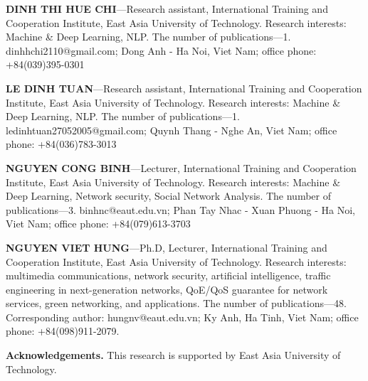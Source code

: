 \documentclass[10pt]{SPIIRAS_Proceedings}
\begin{document}
\begin{aboutAuthors}
    \textbf{DINH THI HUE CHI}—Research assistant, International Training and Cooperation Institute, East Asia University of Technology. Research interests: Machine \& Deep Learning, NLP. The number of publications—1. dinhhchi2110@gmail.com; Dong Anh - Ha Noi, Viet Nam; office phone: +84(039)395-0301\smallskip
    
    \textbf{LE DINH TUAN}—Research assistant, International Training and Cooperation Institute, East Asia University of Technology. Research interests: Machine \& Deep Learning, NLP. The number of publications—1. ledinhtuan27052005@gmail.com; Quynh Thang - Nghe An, Viet Nam; office phone: +84(036)783-3013\smallskip

    \textbf{NGUYEN CONG BINH}—Lecturer, International Training and Cooperation Institute, East Asia University of Technology. Research interests: Machine \& Deep Learning, Network security, Social Network Analysis. The number of publications—3. binhnc@eaut.edu.vn; Phan Tay Nhac - Xuan Phuong - Ha Noi, Viet Nam; office phone: +84(079)613-3703\smallskip

    \textbf{NGUYEN VIET HUNG}—Ph.D, Lecturer, International Training and Cooperation Institute, East Asia University of Technology. Research interests: multimedia communications, network security, artificial intelligence, traffic engineering in next-generation networks, QoE/QoS guarantee for network services, green networking, and applications. The number of publications—48. Corresponding author: hungnv@eaut.edu.vn; Ky Anh, Ha Tinh, Viet Nam; office phone: +84(098)911-2079.\smallskip

    \textbf{Acknowledgements.} This research is supported by East Asia University of Technology.
\end{aboutAuthors}
\end{document}
